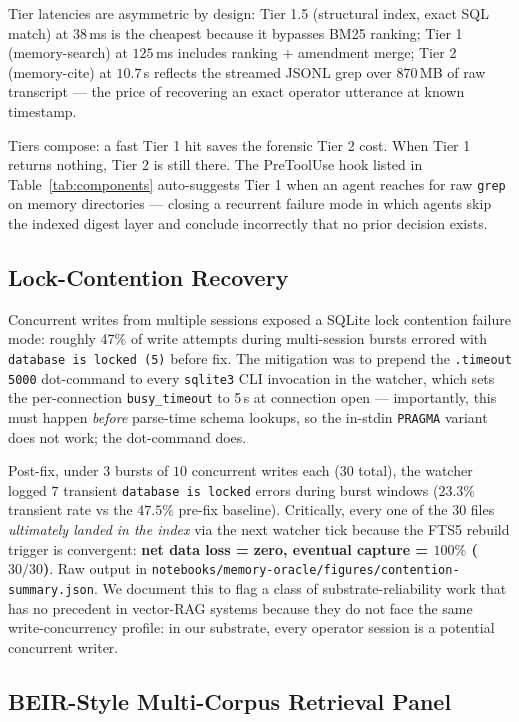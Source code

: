 \documentclass[runningheads]{llncs}
\begin{document}
Tier latencies are asymmetric by design: Tier 1.5 (structural index, exact
SQL match) at $38$\,ms is the cheapest because it bypasses BM25 ranking;
Tier 1 (memory-search) at $125$\,ms includes ranking + amendment merge;
Tier 2 (memory-cite) at $10.7$\,s reflects the streamed JSONL grep over
$870$\,MB of raw transcript --- the price of recovering an exact
operator utterance at known timestamp.

Tiers compose: a fast Tier 1 hit saves the forensic Tier 2 cost. When
Tier 1 returns nothing, Tier 2 is still there. The PreToolUse hook
listed in Table~\ref{tab:components} auto-suggests Tier 1 when an agent
reaches for raw \texttt{grep} on memory directories --- closing a
recurrent failure mode in which agents skip the indexed digest layer
and conclude incorrectly that no prior decision exists.

\subsection{Lock-Contention Recovery}
\label{sec:contention}

Concurrent writes from multiple sessions exposed a SQLite lock contention
failure mode: roughly 47\% of write attempts during multi-session bursts
errored with \texttt{database is locked (5)} before fix. The mitigation
was to prepend the \texttt{.timeout 5000} dot-command to every
\texttt{sqlite3} CLI invocation in the watcher, which sets the per-connection
\texttt{busy\_timeout} to 5\,s at connection open --- importantly, this
must happen \emph{before} parse-time schema lookups, so the in-stdin
\texttt{PRAGMA} variant does not work; the dot-command does.

Post-fix, under $3$ bursts of $10$ concurrent writes each ($30$ total),
the watcher logged $7$ transient \texttt{database is locked} errors
during burst windows ($23.3\%$ transient rate vs the $47.5\%$ pre-fix
baseline). Critically, every one of the $30$ files \emph{ultimately
landed in the index} via the next watcher tick because the FTS5 rebuild
trigger is convergent: \textbf{net data loss = zero, eventual capture =
$100\%$ ($30/30$)}. Raw output in
\texttt{notebooks/memory-oracle/figures/contention-summary.json}. We
document this to flag a class of substrate-reliability work that has no
precedent in vector-RAG systems because they do not face the same
write-concurrency profile: in our substrate, every operator session is
a potential concurrent writer.

\subsection{BEIR-Style Multi-Corpus Retrieval Panel}
\label{sec:beir-panel}
\end{document}
